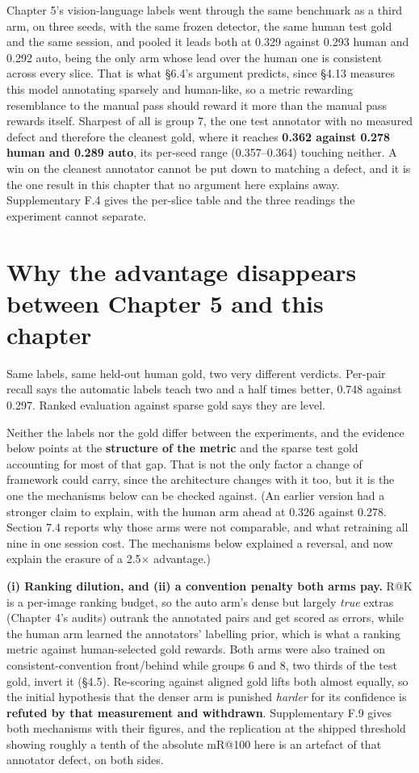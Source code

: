 Chapter 5's vision-language labels went through the same benchmark as a third arm, on three seeds, with the same frozen detector, the same human test gold and the same session, and pooled it leads both at 0.329 against 0.293 human and 0.292 auto, being the only arm whose lead over the human one is consistent across every slice. That is what \S{}6.4's argument predicts, since \S{}4.13 measures this model annotating sparsely and human-like, so a metric rewarding resemblance to the manual pass should reward it more than the manual pass rewards itself. Sharpest of all is group 7, the one test annotator with no measured defect and therefore the cleanest gold, where it reaches \textbf{0.362 against 0.278 human and 0.289 auto}, its per-seed range (0.357--0.364) touching neither. A win on the cleanest annotator cannot be put down to matching a defect, and it is the one result in this chapter that no argument here explains away. Supplementary F.4 gives the per-slice table and the three readings the experiment cannot separate.

\section{Why the advantage disappears between Chapter 5 and this chapter}

Same labels, same held-out human gold, two very different verdicts. Per-pair recall says the automatic labels teach two and a half times better, 0.748 against 0.297. Ranked evaluation against sparse gold says they are level.

Neither the labels nor the gold differ between the experiments, and the evidence below points at the \textbf{structure of the metric} and the sparse test gold accounting for most of that gap. That is not the only factor a change of framework could carry, since the architecture changes with it too, but it is the one the mechanisms below can be checked against. (An earlier version had a stronger claim to explain, with the human arm ahead at 0.326 against 0.278. Section 7.4 reports why those arms were not comparable, and what retraining all nine in one session cost. The mechanisms below explained a reversal, and now explain the erasure of a 2.5$\times$ advantage.)

\textbf{(i) Ranking dilution, and (ii) a convention penalty both arms pay.} R@K is a per-image ranking budget, so the auto arm's dense but largely \textit{true} extras (Chapter 4's audits) outrank the annotated pairs and get scored as errors, while the human arm learned the annotators' labelling prior, which is what a ranking metric against human-selected gold rewards. Both arms were also trained on consistent-convention front/behind while groups 6 and 8, two thirds of the test gold, invert it (\S{}4.5). Re-scoring against aligned gold lifts both almost equally, so the initial hypothesis that the denser arm is punished \textit{harder} for its confidence is \textbf{refuted by that measurement and withdrawn}. Supplementary F.9 gives both mechanisms with their figures, and the replication at the shipped threshold showing roughly a tenth of the absolute mR@100 here is an artefact of that annotator defect, on both sides.

